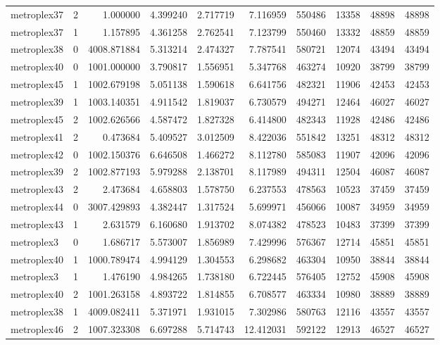 \begin{longtable}{|l|r|r|r|r|r|r|r|r|r|}
metroplex37 & 2 & 1.000000 & 4.399240 & 2.717719 & 7.116959 & 550486 & 13358 & 48898 & 48898 \\
metroplex37 & 1 & 1.157895 & 4.361258 & 2.762541 & 7.123799 & 550460 & 13332 & 48859 & 48859 \\
metroplex38 & 0 & 4008.871884 & 5.313214 & 2.474327 & 7.787541 & 580721 & 12074 & 43494 & 43494 \\
metroplex40 & 0 & 1001.000000 & 3.790817 & 1.556951 & 5.347768 & 463274 & 10920 & 38799 & 38799 \\
metroplex45 & 1 & 1002.679198 & 5.051138 & 1.590618 & 6.641756 & 482321 & 11906 & 42453 & 42453 \\
metroplex39 & 1 & 1003.140351 & 4.911542 & 1.819037 & 6.730579 & 494271 & 12464 & 46027 & 46027 \\
metroplex45 & 2 & 1002.626566 & 4.587472 & 1.827328 & 6.414800 & 482343 & 11928 & 42486 & 42486 \\
metroplex41 & 2 & 0.473684 & 5.409527 & 3.012509 & 8.422036 & 551842 & 13251 & 48312 & 48312 \\
metroplex42 & 0 & 1002.150376 & 6.646508 & 1.466272 & 8.112780 & 585083 & 11907 & 42096 & 42096 \\
metroplex39 & 2 & 1002.877193 & 5.979288 & 2.138701 & 8.117989 & 494311 & 12504 & 46087 & 46087 \\
metroplex43 & 2 & 2.473684 & 4.658803 & 1.578750 & 6.237553 & 478563 & 10523 & 37459 & 37459 \\
metroplex44 & 0 & 3007.429893 & 4.382447 & 1.317524 & 5.699971 & 456066 & 10087 & 34959 & 34959 \\
metroplex43 & 1 & 2.631579 & 6.160680 & 1.913702 & 8.074382 & 478523 & 10483 & 37399 & 37399 \\
metroplex3 & 0 & 1.686717 & 5.573007 & 1.856989 & 7.429996 & 576367 & 12714 & 45851 & 45851 \\
metroplex40 & 1 & 1000.789474 & 4.994129 & 1.304553 & 6.298682 & 463304 & 10950 & 38844 & 38844 \\
metroplex3 & 1 & 1.476190 & 4.984265 & 1.738180 & 6.722445 & 576405 & 12752 & 45908 & 45908 \\
metroplex40 & 2 & 1001.263158 & 4.893722 & 1.814855 & 6.708577 & 463334 & 10980 & 38889 & 38889 \\
metroplex38 & 1 & 4009.082411 & 5.371971 & 1.931015 & 7.302986 & 580763 & 12116 & 43557 & 43557 \\
metroplex46 & 2 & 1007.323308 & 6.697288 & 5.714743 & 12.412031 & 592122 & 12913 & 46527 & 46527 \\

\end{longtable}
